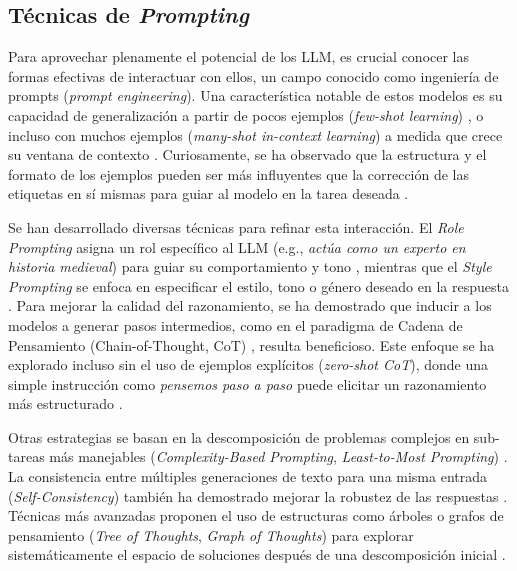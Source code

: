 \subsection{Técnicas de \textit{Prompting}}
\label{subsec:tecnicas_prompting}

Para aprovechar plenamente el potencial de los LLM, es crucial conocer las formas efectivas de interactuar con ellos, un campo conocido como ingeniería de prompts (\textit{prompt engineering}). Una característica notable de estos modelos es su capacidad de generalización a partir de pocos ejemplos (\textit{few-shot learning}) \citep{brownLanguageModelsAre2020}, o incluso con muchos ejemplos (\textit{many-shot in-context learning}) a medida que crece su ventana de contexto \citep{agarwalManyShotInContextLearning2024}. Curiosamente, se ha observado que la estructura y el formato de los ejemplos pueden ser más influyentes que la corrección de las etiquetas en sí mismas para guiar al modelo en la tarea deseada \citep{minRethinkingRoleDemonstrations2022}.

Se han desarrollado diversas técnicas para refinar esta interacción. El \textit{Role Prompting} asigna un rol específico al LLM (e.g., \textit{actúa como un experto en historia medieval}) para guiar su comportamiento y tono \citep{kongBetterZeroShotReasoning2024}, mientras que el \textit{Style Prompting} se enfoca en especificar el estilo, tono o género deseado en la respuesta \citep{luBoundingCapabilitiesLarge2023}. Para mejorar la calidad del razonamiento, se ha demostrado que inducir a los modelos a generar pasos intermedios, como en el paradigma de Cadena de Pensamiento (Chain-of-Thought, CoT) \citep{nyeShowYourWork2021, weiChainofThoughtPromptingElicits2023}, resulta beneficioso. Este enfoque se ha explorado incluso sin el uso de ejemplos explícitos (\textit{zero-shot CoT}), donde una simple instrucción como \textit{pensemos paso a paso} puede elicitar un razonamiento más estructurado \citep{kojimaLargeLanguageModels2023, wangPlanandSolvePromptingImproving2023}.

Otras estrategias se basan en la descomposición de problemas complejos en sub-tareas más manejables (\textit{Complexity-Based Prompting}, \textit{Least-to-Most Prompting}) \citep{fuComplexityBasedPromptingMultiStep2023, zhouLeasttoMostPromptingEnables2023}. La consistencia entre múltiples generaciones de texto para una misma entrada (\textit{Self-Consistency}) también ha demostrado mejorar la robustez de las respuestas \citep{wangSelfConsistencyImprovesChain2023}. Técnicas más avanzadas proponen el uso de estructuras como árboles o grafos de pensamiento (\textit{Tree of Thoughts}, \textit{Graph of Thoughts}) para explorar sistemáticamente el espacio de soluciones después de una descomposición inicial \citep{yaoTreeThoughtsDeliberate2023, bestaGraphThoughtsSolving2024}.


